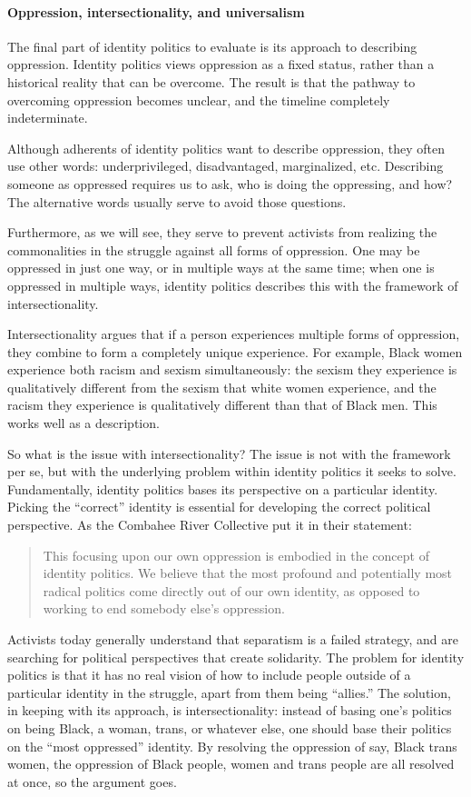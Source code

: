 \paragraph{Oppression, intersectionality, and universalism}

The final part of identity politics to evaluate is its approach to describing oppression. Identity politics views oppression as a fixed status, rather than a historical reality that can be overcome. The result is that the pathway to overcoming oppression becomes unclear, and the timeline completely indeterminate.

Although adherents of identity politics want to describe oppression, they often use other words: underprivileged, disadvantaged, marginalized, etc. Describing someone as oppressed requires us to ask, who is doing the oppressing, and how? The alternative words usually serve to avoid those questions.

Furthermore, as we will see, they serve to prevent activists from realizing the commonalities in the struggle against all forms of oppression. One may be oppressed in just one way, or in multiple ways at the same time; when one is oppressed in multiple ways, identity politics describes this with the framework of intersectionality.

Intersectionality argues that if a person experiences multiple forms of oppression, they combine to form a completely unique experience. For example, Black women experience both racism and sexism simultaneously: the sexism they experience is qualitatively different from the sexism that white women experience, and the racism they experience is qualitatively different than that of Black men. This works well as a description.

So what is the issue with intersectionality? The issue is not with the framework per se, but with the underlying problem within identity politics it seeks to solve. Fundamentally, identity politics bases its perspective on a particular identity. Picking the ``correct'' identity is essential for developing the correct political perspective. As the Combahee River Collective put it in their statement:

\blockquote{This focusing upon our own oppression is embodied in the concept of identity politics. We believe that the most profound and potentially most radical politics come directly out of our own identity, as opposed to working to end somebody else's oppression.}

Activists today generally understand that separatism is a failed strategy, and are searching for political perspectives that create solidarity. The problem for identity politics is that it has no real vision of how to include people outside of a particular identity in the struggle, apart from them being ``allies.'' The solution, in keeping with its approach, is intersectionality: instead of basing one's politics on being Black, a woman, trans, or whatever else, one should base their politics on the ``most oppressed'' identity. By resolving the oppression of say, Black trans women, the oppression of Black people, women and trans people are all resolved at once, so the argument goes.

